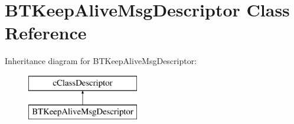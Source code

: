 \hypertarget{classBTKeepAliveMsgDescriptor}{}\section{B\+T\+Keep\+Alive\+Msg\+Descriptor Class Reference}
\label{classBTKeepAliveMsgDescriptor}
Inheritance diagram for B\+T\+Keep\+Alive\+Msg\+Descriptor\+:\begin{figure}[H]
\begin{center}
\leavevmode
\includegraphics[height=2.000000cm]{classBTKeepAliveMsgDescriptor}
\end{center}
\end{figure}
